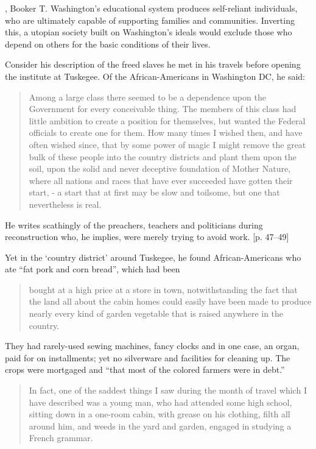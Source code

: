 , Booker T. Washington's educational system produces self-reliant individuals, who are ultimately capable of supporting families and communities. Inverting this, a utopian society built on Washington's ideals would exclude those who depend on others for the basic conditions of their lives.

Consider his description of the freed slaves he met in his travels before opening the institute at Tuskegee. Of the African-Americans in Washington DC, he said:

\begin{quote}

Among a large class there seemed to be a dependence upon the Government for every conceivable thing. The members of this class had little ambition to create a position for themselves, but wanted the Federal officials to create one for them. How many times I wished then, and have often wished since, that by some power of magic I might remove the great bulk of these people into the country districts and plant them upon the soil, upon the solid and never deceptive foundation of Mother Nature, where all nations and races that have ever succeeded have gotten their start, - a start that at first may be slow and toilsome, but one that nevertheless is real.
\end{quote}

He writes scathingly of the preachers, teachers and politicians during reconstruction who, he implies, were merely trying to avoid work. [p. 47--49] 

Yet in the `country district' around Tuskegee, he found African-Americans who ate ``fat pork and corn bread'', which had been 

\begin{quote}

bought at a high price at a store in town, notwithstanding the fact that the land all about the cabin homes could easily have been made to produce nearly every kind of garden vegetable that is raised anywhere in the country. ~\citep[p. 66]{Washington:1952uf}
\end{quote}

They had rarely-used sewing machines, fancy clocks and in one case, an organ, paid for on installments; yet no silverware and facilities for cleaning up. The crops were mortgaged and ``that most of the colored farmers were in debt.'' ~\citep[p. 67]{Washington:1952uf}

\begin{quote}

In fact, one of the saddest things I saw during the month of travel which I have described was a young man, who had attended some high school, sitting down in a one-room cabin, with grease on his clothing, filth all around him, and weeds in the yard and garden, engaged in studying a French grammar. ~\citep[p. 71]{Washington:1952uf}
\end{quote}

